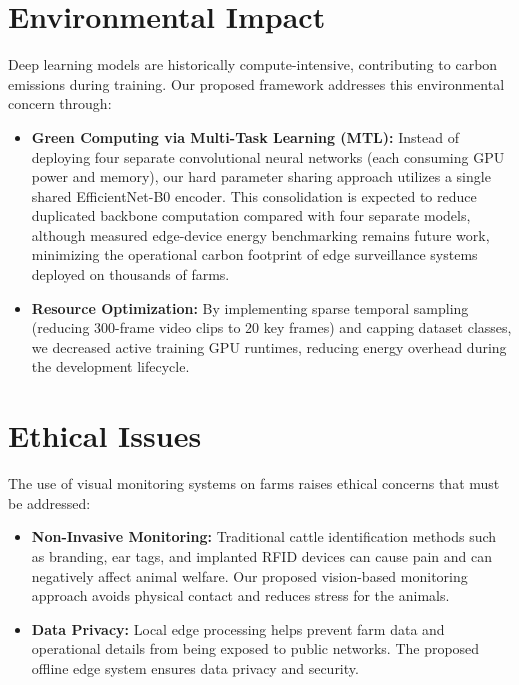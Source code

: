 \section{Environmental Impact}
Deep learning models are historically compute-intensive, contributing to carbon emissions during training. Our proposed framework addresses this environmental concern through:
\begin{itemize}
    \item \textbf{Green Computing via Multi-Task Learning (MTL):} Instead of deploying four separate convolutional neural networks (each consuming GPU power and memory), our hard parameter sharing approach utilizes a single shared EfficientNet-B0 encoder. This consolidation is expected to reduce duplicated backbone computation compared with four separate models, although measured edge-device energy benchmarking remains future work, minimizing the operational carbon footprint of edge surveillance systems deployed on thousands of farms.
    \item \textbf{Resource Optimization:} By implementing sparse temporal sampling (reducing 300-frame video clips to 20 key frames) and capping dataset classes, we decreased active training GPU runtimes, reducing energy overhead during the development lifecycle.
\end{itemize}

\section{Ethical Issues}
The use of visual monitoring systems on farms raises ethical concerns that must be addressed:
\begin{itemize}
    \item \textbf{Non-Invasive Monitoring:} Traditional cattle identification methods such as branding, ear tags, and implanted RFID devices can cause pain and can negatively affect animal welfare. Our proposed vision-based monitoring approach avoids physical contact and reduces stress for the animals.
    \item \textbf{Data Privacy:} Local edge processing helps prevent farm data and operational details from being exposed to public networks. The proposed offline edge system ensures data privacy and security.
\end{itemize}

